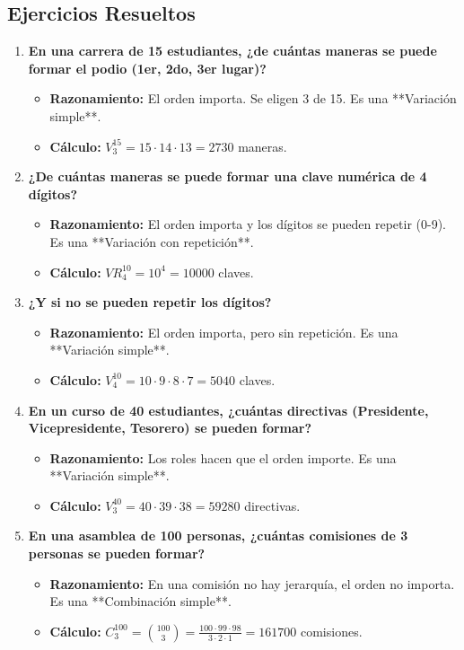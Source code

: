 \documentclass[12pt, letterpaper]{article}
\begin{document}
\subsection*{Ejercicios Resueltos}
\begin{enumerate}[leftmargin=*,label=\arabic*.]
	\item \textbf{En una carrera de 15 estudiantes, ¿de cuántas maneras se puede formar el podio (1er, 2do, 3er lugar)?}
	      \begin{itemize}
		      \item \textbf{Razonamiento:} El orden importa. Se eligen 3 de 15. Es una **Variación simple**.
		      \item \textbf{Cálculo:} $V_3^{15} = 15 \cdot 14 \cdot 13 = 2730$ maneras.
	      \end{itemize}

	\item \textbf{¿De cuántas maneras se puede formar una clave numérica de 4 dígitos?}
	      \begin{itemize}
		      \item \textbf{Razonamiento:} El orden importa y los dígitos se pueden repetir (0-9). Es una **Variación con repetición**.
		      \item \textbf{Cálculo:} $VR_4^{10} = 10^4 = 10000$ claves.
	      \end{itemize}

	\item \textbf{¿Y si no se pueden repetir los dígitos?}
	      \begin{itemize}
		      \item \textbf{Razonamiento:} El orden importa, pero sin repetición. Es una **Variación simple**.
		      \item \textbf{Cálculo:} $V_4^{10} = 10 \cdot 9 \cdot 8 \cdot 7 = 5040$ claves.
	      \end{itemize}

	\item \textbf{En un curso de 40 estudiantes, ¿cuántas directivas (Presidente, Vicepresidente, Tesorero) se pueden formar?}
	      \begin{itemize}
		      \item \textbf{Razonamiento:} Los roles hacen que el orden importe. Es una **Variación simple**.
		      \item \textbf{Cálculo:} $V_3^{40} = 40 \cdot 39 \cdot 38 = 59280$ directivas.
	      \end{itemize}

	\item \textbf{En una asamblea de 100 personas, ¿cuántas comisiones de 3 personas se pueden formar?}
	      \begin{itemize}
		      \item \textbf{Razonamiento:} En una comisión no hay jerarquía, el orden no importa. Es una **Combinación simple**.
		      \item \textbf{Cálculo:} $C_3^{100} = \binom{100}{3} = \frac{100 \cdot 99 \cdot 98}{3 \cdot 2 \cdot 1} = 161700$ comisiones.
	      \end{itemize}
\end{enumerate}
\newpage
\end{document}
